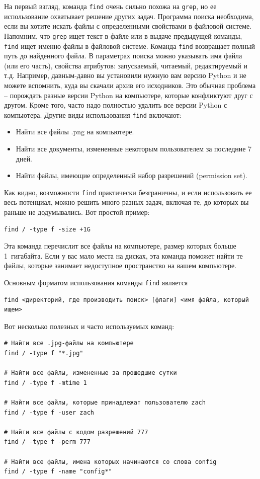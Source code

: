 \documentclass[12pt]{article}
\providecommand{\tightlist}{%
  \setlength{\itemsep}{0pt}\setlength{\parskip}{0pt}}
\begin{document}
На первый взгляд, команда \texttt{find} очень сильно похожа на \texttt{grep}, но ее
использование охватывает решение других задач. Программа поиска
необходима, если вы хотите искать файлы с определенными свойствами в
файловой системе. Напомним, что \texttt{grep} ищет текст в файле или в
выдаче предыдущей команды, \texttt{find} ищет именно файлы в файловой
системе. Команда \texttt{find} возвращает полный путь до найденного файла.
В параметрах поиска можно указывать
имя файла (или его часть), свойства атрибутов: запускаемый, читаемый, редактируемый и т.д.
Например, давным-давно вы установили нужную вам версию Python и не
можете вспомнить, куда вы скачали архив его исходников. Это обычная
проблема -- порождать разные версии Python на компьютере, которые конфликтуют
друг с другом. Кроме того, часто надо полностью удалить все версии
Python с компьютера. Другие виды использования \texttt{find} включают:
\begin{itemize}
\tightlist
\item
  Найти все файлы .png на компьютере.
\item
  Найти все документы, измененные некоторым пользователем за последние 7
  дней.
\item
  Найти файлы, имеющие определенный набор разрешений (permission set).
\end{itemize}

Как видно, возможности \texttt{find} практически безграничны, и если
использовать ее весь потенциал, можно решить много разных задач, включая
те, до которых вы раньше не додумывались. Вот простой пример:
\begin{verbatim}
find / -type f -size +1G
\end{verbatim}
Эта команда перечислит все файлы на компьютере, размер которых больше 1~гигабайта.
Если у вас мало места на дисках, эта команда поможет найти те
файлы, которые занимает недоступное пространство на вашем компьютере.

Основным форматом использования команды \texttt{find} является
\begin{verbatim}
find <директорий, где производить поиск> [флаги] <имя файла, который ищем>
\end{verbatim}

Вот несколько полезных и часто используемых команд:
\begin{verbatim}
# Найти все .jpg-файлы на компьютере
find / -type f "*.jpg"

# Найти все файлы, измененные за прошедшие сутки
find / -type f -mtime 1

# Найти все файлы, которые принадлежат пользователю zach
find / -type f -user zach

# Найти все файлы с кодом разрешений 777
find / -type f -perm 777

# Найти все файлы, имена которых начинаются со слова config
find / -type f -name "config*"
\end{verbatim}
\end{document}
